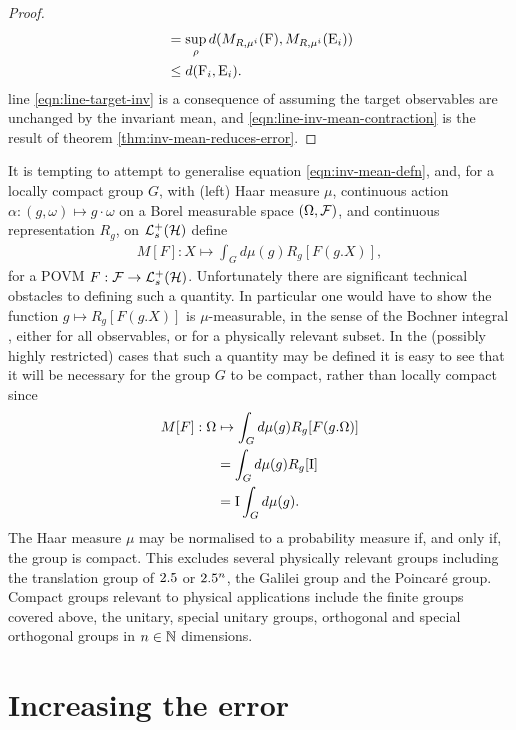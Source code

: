\begin{thm}
\begin{proof}
\begin{align}
      \label{eqn:line-target-inv}
                                           &= \sup_\rho d(M_{R, \mu^i}(\operatorname{F}),  M_{R, \mu^i}(\operatorname{E}_i))\\
      \label{eqn:line-inv-mean-contraction}
                                           &\leq d(\operatorname{F}_i, \operatorname{E}_i).
    \end{align}
    line \eqref{eqn:line-target-inv} is a consequence of assuming the target observables are unchanged by the invariant mean, and \eqref{eqn:line-inv-mean-contraction} is the result of theorem \ref{thm:inv-mean-reduces-error}.
  \end{proof}
\end{thm}

It is tempting to attempt to generalise equation \ref{eqn:inv-mean-defn}, and, for a locally compact group $G$, with (left) Haar measure $\mu$, continuous action $\alpha: (g,\omega)\mapsto g\cdot\omega$ on a Borel measurable space $(\Omega, \mathcal{F})$, and continuous representation $R_g$, on $\posops[\hcal]$ define
\begin{align}
  M[F]: X\mapsto\int_G d\mu(g) R_g[F(g.X)],
\end{align}
for a POVM $F:\fcal\to\posops[\hcal]$. Unfortunately there are significant technical obstacles to defining such a quantity. In particular one would have to show the function $g\mapsto R_g[F(g.X)]$ is $\mu$-measurable, in the sense of the Bochner integral , either for all observables, or for a physically relevant subset. In the (possibly highly restricted) cases that such a quantity may be defined it is easy to see that it will be necessary for the group $G$ to be compact, rather than locally compact since
\begin{align}
  M[F]:\Omega&\mapsto\int_G d\mu(g) R_g[F(g.\Omega)]\\
             &=\int_G d\mu(g) R_g[\operatorname{I}]\\
             &=\operatorname{I}\int_G d\mu(g).\label{eqn:inv-mean-identity-infinite-case}
\end{align}
The Haar measure $\mu$ may be normalised to a probability measure if, and only if, the group is compact. This excludes several physically relevant groups including the translation group of $2.5$ or $2.5^n$, the Galilei group and the Poincar{\'e} group. Compact groups relevant to physical applications include the finite groups covered above, the unitary, special unitary groups, orthogonal and special orthogonal groups in $n\in\mathbb{N}$ dimensions.

\section{Increasing the error}
\label{sec:inc-error}

